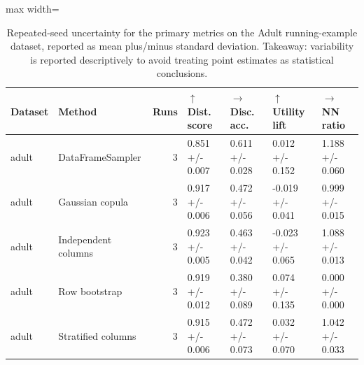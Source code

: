 \begin{table}
\caption{Repeated-seed uncertainty for the primary metrics on the Adult running-example dataset, reported as mean plus/minus standard deviation. Takeaway: variability is reported descriptively to avoid treating point estimates as statistical conclusions.}
\label{tab:primary-uncertainty}
\begin{adjustbox}{max width=\textwidth}
\begin{tabular}{llrllll}
\toprule
Dataset & Method & Runs & $\uparrow$ Dist. score & $\rightarrow$ Disc. acc. & $\uparrow$ Utility lift & $\rightarrow$ NN ratio \\
\midrule
adult & DataFrameSampler & 3 & 0.851 +/- 0.007 & 0.611 +/- 0.028 & 0.012 +/- 0.152 & 1.188 +/- 0.060 \\
adult & Gaussian copula & 3 & 0.917 +/- 0.006 & 0.472 +/- 0.056 & -0.019 +/- 0.041 & 0.999 +/- 0.015 \\
adult & Independent columns & 3 & 0.923 +/- 0.005 & 0.463 +/- 0.042 & -0.023 +/- 0.065 & 1.088 +/- 0.013 \\
adult & Row bootstrap & 3 & 0.919 +/- 0.012 & 0.380 +/- 0.089 & 0.074 +/- 0.135 & 0.000 +/- 0.000 \\
adult & Stratified columns & 3 & 0.915 +/- 0.006 & 0.472 +/- 0.073 & 0.032 +/- 0.070 & 1.042 +/- 0.033 \\
\bottomrule
\end{tabular}
\end{adjustbox}
\end{table}
